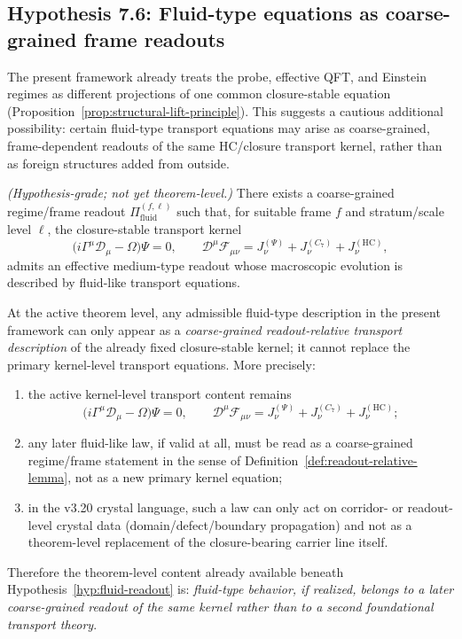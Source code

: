 \subsection{Hypothesis 7.6: Fluid-type equations as coarse-grained frame readouts}
\label{subsec:fluid-readout-hypothesis}

The present framework already treats the probe, effective QFT, and
Einstein regimes as different projections of one common closure-stable
equation (Proposition~\ref{prop:structural-lift-principle}). This
suggests a cautious additional possibility: certain fluid-type transport
equations may arise as coarse-grained, frame-dependent readouts of the
same HC/closure transport kernel, rather than as foreign structures added
from outside.

\begin{proposition}
\label{hyp:fluid-readout}
\emph{(Hypothesis-grade; not yet theorem-level.)}
There exists a coarse-grained regime/frame readout
$\Pi_{\mathrm{fluid}}^{(f,\ell)}$
such that, for suitable frame $f$ and stratum/scale level $\ell$, the
closure-stable transport kernel
\[
  \bigl(i\Gamma^\mu\mathcal{D}_\mu - \Omega\bigr)\Psi = 0,
  \qquad
  \mathcal{D}^\mu\mathcal{F}_{\mu\nu}
  = J^{(\Psi)}_\nu + J^{(C_7)}_\nu + J^{(\mathrm{HC})}_\nu,
\]
admits an effective medium-type readout whose macroscopic evolution is
described by fluid-like transport equations.
\end{proposition}

\begin{theorem}
\label{thm:theorem-level-shadow-fluid-type-readout}
At the active theorem level, any admissible fluid-type description in the present framework can only appear as a \emph{coarse-grained readout-relative transport description} of the already fixed closure-stable kernel; it cannot replace the primary kernel-level transport equations. More precisely:
\begin{enumerate}[leftmargin=2em,label=(\roman*)]
  \item the active kernel-level transport content remains
  \[
    \bigl(i\Gamma^\mu\mathcal{D}_\mu - \Omega\bigr)\Psi = 0,
    \qquad
    \mathcal{D}^\mu\mathcal{F}_{\mu\nu}
    = J^{(\Psi)}_\nu + J^{(C_7)}_\nu + J^{(\mathrm{HC})}_\nu;
  \]
  \item any later fluid-like law, if valid at all, must be read as a coarse-grained regime/frame statement in the sense of Definition~\ref{def:readout-relative-lemma}, not as a new primary kernel equation;
  \item in the v3.20 crystal language, such a law can only act on corridor- or readout-level crystal data (domain/defect/boundary propagation) and not as a theorem-level replacement of the closure-bearing carrier line itself.
\end{enumerate}
Therefore the theorem-level content already available beneath Hypothesis~\ref{hyp:fluid-readout} is: \emph{fluid-type behavior, if realized, belongs to a later coarse-grained readout of the same kernel rather than to a second foundational transport theory}.
\end{theorem}

